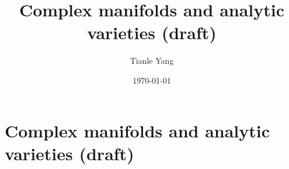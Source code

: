 \documentclass{noteformyself}
\title{Complex manifolds and analytic varieties (draft)}
\author{Tianle Yang}
\date{\today}
\begin{document}
    \maketitle
    \section{Complex manifolds and analytic varieties (draft)}




    \printbibliography[heading=bibintoc, title={References}] 
\end{document}
